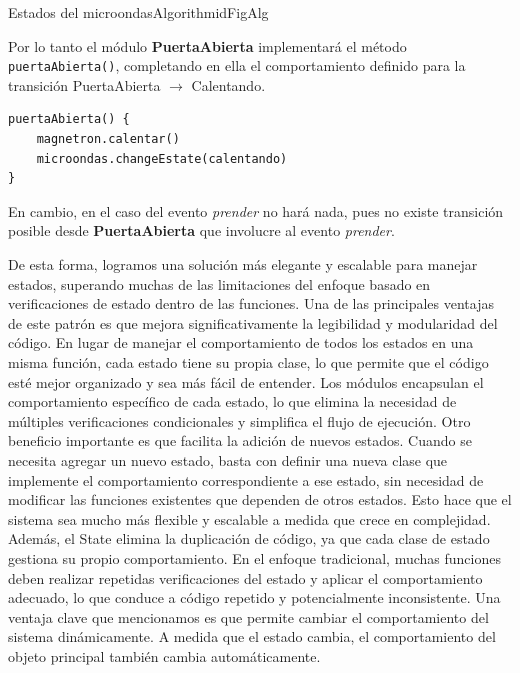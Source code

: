 \begin{pattern}[]{Estados del microondas}{Algorithm}{idFigAlg}
\assigns
{}

\end{pattern}

Por lo tanto el módulo \textbf{PuertaAbierta} implementará el método \verb|puertaAbierta()|, completando en ella el comportamiento definido para la transición PuertaAbierta $\xrightarrow{}$ Calentando.

\begin{lstlisting}[caption=Implementación  puertaAbierta]
puertaAbierta() {
    magnetron.calentar()
    microondas.changeEstate(calentando)
}
\end{lstlisting}

En cambio, en el caso del evento \textit{prender} no hará nada, pues no existe transición posible desde \textbf{PuertaAbierta} que involucre al evento \textit{prender}.

De esta forma, logramos una solución más elegante y escalable para manejar estados, superando muchas de las limitaciones del enfoque basado en verificaciones de estado dentro de las funciones. Una de las principales ventajas de este patrón es que mejora significativamente la legibilidad y modularidad del código. En lugar de manejar el comportamiento de todos los estados en una misma función, cada estado tiene su propia clase, lo que permite que el código esté mejor organizado y sea más fácil de entender. Los módulos encapsulan el comportamiento específico de cada estado, lo que elimina la necesidad de múltiples verificaciones condicionales y simplifica el flujo de ejecución. Otro beneficio importante es que facilita la adición de nuevos estados. Cuando se necesita agregar un nuevo estado, basta con definir una nueva clase que implemente el comportamiento correspondiente a ese estado, sin necesidad de modificar las funciones existentes que dependen de otros estados. Esto hace que el sistema sea mucho más flexible y escalable a medida que crece en complejidad. Además, el State elimina la duplicación de código, ya que cada clase de estado gestiona su propio comportamiento. En el enfoque tradicional, muchas funciones deben realizar repetidas verificaciones del estado y aplicar el comportamiento adecuado, lo que conduce a código repetido y potencialmente inconsistente. Una ventaja clave que mencionamos es que permite cambiar el comportamiento del sistema dinámicamente. A medida que el estado cambia, el comportamiento del objeto principal también cambia automáticamente. 

